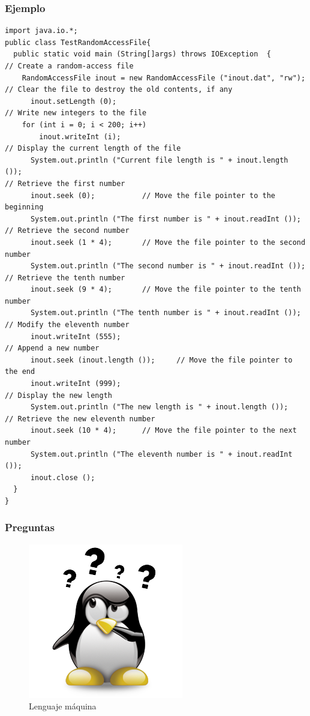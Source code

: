 \documentclass{beamer}
\begin{document}
\begin{frame}[fragile]
\frametitle{Ejemplo}
\begin{tiny}
\begin{verbatim}
import java.io.*;
public class TestRandomAccessFile{
  public static void main (String[]args) throws IOException  {
// Create a random-access file
    RandomAccessFile inout = new RandomAccessFile ("inout.dat", "rw");
// Clear the file to destroy the old contents, if any
      inout.setLength (0);
// Write new integers to the file
    for (int i = 0; i < 200; i++)
        inout.writeInt (i);
// Display the current length of the file
      System.out.println ("Current file length is " + inout.length ());
// Retrieve the first number
      inout.seek (0);           // Move the file pointer to the beginning
      System.out.println ("The first number is " + inout.readInt ());
// Retrieve the second number
      inout.seek (1 * 4);       // Move the file pointer to the second number
      System.out.println ("The second number is " + inout.readInt ());
// Retrieve the tenth number
      inout.seek (9 * 4);       // Move the file pointer to the tenth number
      System.out.println ("The tenth number is " + inout.readInt ());
// Modify the eleventh number
      inout.writeInt (555);
// Append a new number
      inout.seek (inout.length ());     // Move the file pointer to the end
      inout.writeInt (999);
// Display the new length
      System.out.println ("The new length is " + inout.length ());
// Retrieve the new eleventh number
      inout.seek (10 * 4);      // Move the file pointer to the next number
      System.out.println ("The eleventh number is " + inout.readInt ());
      inout.close ();
  }
}
\end{verbatim}
\end{tiny}
\end{frame}

\begin{frame}
\frametitle{Preguntas} 
\begin{figure}
\includegraphics[scale=0.9]{imagenes/dudas.png} 
\caption{Lenguaje máquina}
\end{figure} 
\end{frame}
\end{document}
